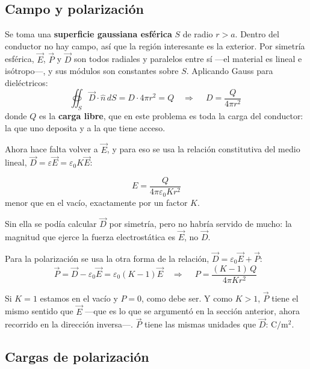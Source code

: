 \documentclass[12pt,a4paper]{article}
\begin{document}
\subsection{Campo y polarización}

Se toma una \textbf{superficie gaussiana esférica} $S$ de radio $r > a$. Dentro
del conductor no hay campo, así que la región interesante es la exterior. Por
simetría esférica, $\vec E$, $\vec P$ y $\vec D$ son todos radiales y paralelos
entre sí ---el material es lineal e isótropo---, y sus módulos son constantes
sobre $S$. Aplicando Gauss para dieléctricos:
\[
\oiint_S \vec D \cdot \hat n \, dS = D \cdot 4\pi r^2 = Q
\quad\Longrightarrow\quad
\boxed{\ D = \frac{Q}{4\pi r^2}\ }
\]
donde $Q$ es la \textbf{carga libre}, que en este problema es toda la carga del
conductor: la que uno deposita y a la que tiene acceso.

Ahora hace falta volver a $\vec E$, y para eso se usa la relación constitutiva
del medio lineal, $\vec D = \varepsilon \vec E = \varepsilon_0 K \vec E$:

\begin{keybox}
\[
\boxed{\ E = \frac{Q}{4\pi\varepsilon_0 K r^2}\ }
\]
menor que en el vacío, exactamente por un factor $K$.
\end{keybox}

\begin{notebox}
Sin ella se podía calcular $\vec D$ por simetría, pero no habría servido de
mucho: la magnitud que ejerce la fuerza electrostática es $\vec E$, no $\vec D$.
\end{notebox}

Para la polarización se usa la otra forma de la relación,
$\vec D = \varepsilon_0 \vec E + \vec P$:
\[
\vec P = \vec D - \varepsilon_0 \vec E
= \varepsilon_0 (K-1) \vec E
\quad\Longrightarrow\quad
\boxed{\ P = \frac{(K-1)\,Q}{4\pi K r^2}\ }
\]

\begin{notebox}[Coherencia]
Si $K = 1$ estamos en el vacío y $P = 0$, como debe ser. Y como $K > 1$,
$\vec P$ tiene el mismo sentido que $\vec E$ ---que es lo que se argumentó en la
sección anterior, ahora recorrido en la dirección inversa---. $\vec P$ tiene las
mismas unidades que $\vec D$: $\si{\coulomb\per\metre\squared}$.
\end{notebox}

\subsection{Cargas de polarización}
\end{document}
